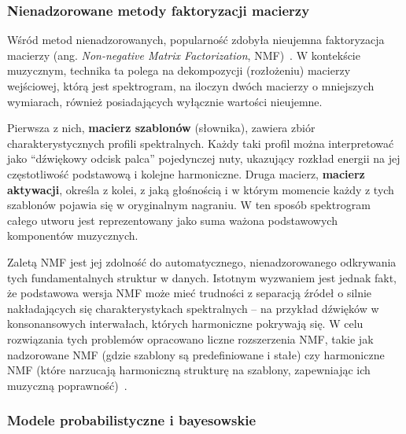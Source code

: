 \subsubsection{Nienadzorowane metody faktoryzacji macierzy}
\label{sssec:nmf_atm}

Wśród metod nienadzorowanych, popularność zdobyła nieujemna faktoryzacja macierzy (ang. \textit{Non-negative Matrix Factorization}, NMF)~\autocite{Benetos2019AutomaticMusicTranscription}. W kontekście muzycznym, technika ta polega na dekompozycji (rozłożeniu) macierzy wejściowej, którą jest spektrogram, na iloczyn dwóch macierzy o mniejszych wymiarach, również posiadających wyłącznie wartości nieujemne.

Pierwsza z nich, \textbf{macierz szablonów} (słownika), zawiera zbiór charakterystycznych profili spektralnych. Każdy taki profil można interpretować jako ``dźwiękowy odcisk palca'' pojedynczej nuty, ukazujący rozkład energii na jej częstotliwość podstawową i kolejne harmoniczne. Druga macierz, \textbf{macierz aktywacji}, określa z kolei, z jaką głośnością i w którym momencie każdy z tych szablonów pojawia się w oryginalnym nagraniu. W ten sposób spektrogram całego utworu jest reprezentowany jako suma ważona podstawowych komponentów muzycznych.

Zaletą NMF jest jej zdolność do automatycznego, nienadzorowanego odkrywania tych fundamentalnych struktur w danych. Istotnym wyzwaniem jest jednak fakt, że podstawowa wersja NMF może mieć trudności z separacją źródeł o silnie nakładających się charakterystykach spektralnych -- na przykład dźwięków w konsonansowych interwałach, których harmoniczne pokrywają się. W celu rozwiązania tych problemów opracowano liczne rozszerzenia NMF, takie jak nadzorowane NMF (gdzie szablony są predefiniowane i stałe) czy harmoniczne NMF (które narzucają harmoniczną strukturę na szablony, zapewniając ich muzyczną poprawność)~\autocite{Benetos2019AutomaticMusicTranscription}.

\subsubsection{Modele probabilistyczne i bayesowskie}
\label{sssec:modele_probabilistyczne_atm}

